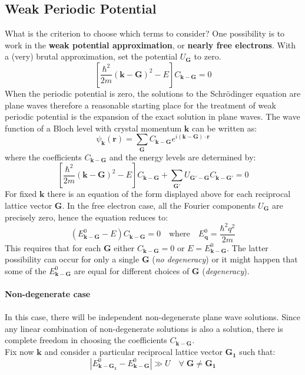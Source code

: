 \documentclass[10.75pt,a4paper,openright,bottom=2cm]{article}
\renewcommand{\Vec}[1]{\boldsymbol{#1}}
\begin{document}
\subsection{Weak Periodic Potential}
What is the criterion to choose which terms to consider? One possibility is to work in the \textbf{weak potential approximation}, or \textbf{nearly free electrons}. With a (very) brutal approximation, set the potential $U_{\Vec{G}}$ to zero.
\[
\left[\frac{\hbar^2}{2m}(\Vec{k}-\Vec{G})^2-E\right]C_{\Vec{k}-\Vec{G}}=0
\]
When the periodic potential is zero, the solutions to the Schr\"odinger equation are plane waves therefore a reasonable starting place for the treatment of weak periodic potential is the expansion of the exact solution in plane waves. The wave function of a Bloch level with crystal momentum $\Vec{k}$ can be written as:
\[
\psi_{\Vec{k}}(\Vec{r})=\sum_{\Vec{G}}C_{\Vec{k}-\Vec{G}}e^{i(\Vec{k}-\Vec{G})\cdot\Vec{r}}
\]
where the coefficients $C_{\Vec{k}-\Vec{G}}$ and the energy levels are determined by:
\begin{equation}
\label{ckk}
\left[\frac{\hbar^2}{2m}(\Vec{k}-\Vec{G})^2-E\right]C_{\Vec{k}-\Vec{G}}+\sum_{\Vec{G'}}U_{\Vec{G'}-\Vec{G}}C_{\Vec{k}-\Vec{G'}}=0
\end{equation}
For fixed $\Vec{k}$ there is an equation of the form displayed above for each reciprocal lattice vector $\Vec{G}$. In the free electron case, all the Fourier components $U_{\Vec{G}}$ are precisely zero, hence the equation reduces to:
\[
(E^0_{\Vec{k}-\Vec{G}}-E)C_{\Vec{k}-\Vec{G}}=0 \quad \text{where} \quad E^0_{\Vec{q}}=\frac{\hbar^2q^2}{2m}
\]
This requires that for each $\Vec{G}$ either $C_{\Vec{k}-\Vec{G}}=0$ or $E=E^0_{\Vec{k}-\Vec{G}}$. The latter possibility can occur for only a single $\Vec{G}$ (\textit{no degeneracy}) or it might happen that some of the $E^0_{\Vec{k}-\Vec{G}}$ are equal for different choices of $\Vec{G}$ (\textit{degeneracy}).\\\\
\textbf{Non-degenerate case}\\\\
In this case, there will be independent non-degenerate plane wave solutions. Since any linear combination of non-degenerate solutions is also a solution, there is complete freedom in choosing the coefficients $C_{\Vec{k}-\Vec{G}}$.\\
Fix now $\Vec{k}$ and consider a particular reciprocal lattice vector $\Vec{G_1}$ such that:
\begin{equation}
\label{assumption}
|E^0_{\Vec{k}-\Vec{G_1}}-E^0_{\Vec{k}-\Vec{G}}|\gg U \quad \forall\;\Vec{G}\neq\Vec{G_1}
\end{equation}
\end{document}
